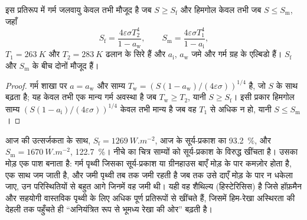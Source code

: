 \begin{proposition}[क्रांतिक बिंदु]\label{prop:b2:precambrian-earth:tipping}
इस प्रतिरूप में गर्म जलवायु केवल तभी मौजूद है जब $S \ge S_{\text{f}}$ और हिमगोल केवल तभी जब
$S \le S_{\text{m}}$, जहाँ
\[
  S_{\text{f}} = \frac{4\varepsilon\sigma T_2^4}{1 - a_{\text{w}}}, \qquad
  S_{\text{m}} = \frac{4\varepsilon\sigma T_1^4}{1 - a_{\text{i}}},
\]
$T_1 = \qty{263}{K}$ और $T_2 = \qty{283}{K}$ ढलान के सिरे हैं और $a_{\text{i}}$,
$a_{\text{w}}$ जमे और गर्म ग्रह के एल्बिडो हैं। $S_{\text{f}}$ और
$S_{\text{m}}$ के बीच दोनों मौजूद हैं।
\end{proposition}

\begin{proof}
गर्म शाखा पर $a = a_{\text{w}}$ और साम्य $T_{\text{w}} = (S(1 -
a_{\text{w}})/(4\varepsilon\sigma))^{1/4}$ है, जो $S$ के साथ बढ़ता है; यह केवल तभी एक मान्य गर्म अवस्था है
जब $T_{\text{w}} \ge T_2$, यानी $S \ge S_{\text{f}}$। इसी प्रकार हिमगोल साम्य
$(S(1 - a_{\text{i}})/(4\varepsilon\sigma))^{1/4}$ केवल तभी मान्य है जब वह $T_1$ से अधिक न हो, यानी
$S \le S_{\text{m}}$।
\end{proof}

आज की उत्सर्जकता के साथ, $S_{\text{f}} = \qty{1269}{W.m^{-2}}$, आज के सूर्य-प्रकाश का \qty{93.2}{\percent},
और $S_{\text{m}} = \qty{1670}{W.m^{-2}}$, \qty{122.7}{\percent}। नीचे का चित्र
साम्यों को सूर्य-प्रकाश के विरुद्ध खींचता है। उसका मोड़ एक पाश बनाता है: गर्म पृथ्वी जिसका सूर्य-प्रकाश
या ग्रीनहाउस बाएँ मोड़ के पार कमज़ोर होता है, एक साथ जम जाती है, और जमी पृथ्वी तब तक जमी रहती है
जब तक उसे दाएँ मोड़ के पार न धकेला जाए, उन परिस्थितियों से बहुत आगे जिनमें वह जमी थी। यही वह
शैथिल्य (हिस्टेरिसिस) है जिसे हॉफ़मैन और सहयोगी वास्तविक पृथ्वी के लिए अधिक पूर्ण प्रतिरूपों से खींचते हैं,
जिसमें हिम-रेखा अस्थिरता की देहली तक पहुँचते ही ``अनियंत्रित रूप से भूमध्य रेखा की ओर''
बढ़ती है।

